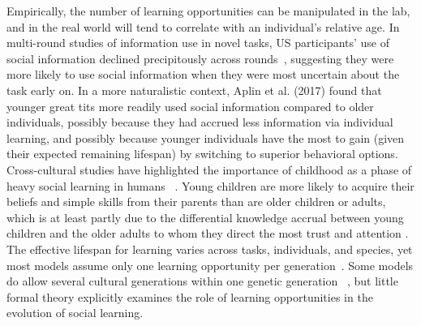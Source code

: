 \documentclass[letterpaper,11.5pt]{scrartcl}
\newcommand{\mt}[1]{{\textcolor{myorange} {({\tiny MT:} #1)}}}
\newcommand{\ps}[1]{{\textcolor{mygreen} {({\tiny PS:} #1)}}}
\begin{document}
Empirically, the number of learning opportunities can be manipulated in the lab, and in the real world will tend to correlate with an individual's relative age. In multi-round
studies of information use in novel tasks, US participants' use of social
information declined precipitously across rounds~\cite{McElreath2005}, suggesting
they were more likely to use social information when they were most uncertain about the task early on. In a more naturalistic context, Aplin et al. (2017)
\nocite{Aplin2017} found that younger great tits more readily used social
information compared to older individuals, possibly because they had accrued
less information via individual learning, and possibly because younger
individuals have the most to gain (given their expected remaining lifespan) by switching to superior behavioral options. 
Cross-cultural studies have highlighted the importance of childhood as a phase
of heavy social learning in humans ~\cite{Reyes2016}. Young children are more likely to
acquire their beliefs and simple skills from their parents than are older children
or adults, which is at least partly due to the differential knowledge accrual
between young children and the older adults to whom they direct the most trust and
attention \cite{kline2013teaching}.
The effective lifespan for learning
varies across tasks, individuals, and species, yet most models assume only one learning
opportunity per generation~\cite{BoydRicherson1985, Feldman1996,Henrich1998, perreault2012bayesian}.
Some models do allow several cultural generations within one genetic generation
~\cite{Enquist2007,Rendell2010,lindstrom2016co}, but little formal theory explicitly examines the role of
learning opportunities in the evolution of social learning. 

\end{document}
